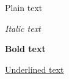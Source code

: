 \documentclass[a4paper]{article}
\begin{document}
	Plain text

	\textit{Italic text}

	\textbf{Bold text}

  \underline{Underlined text}
\end{document}
